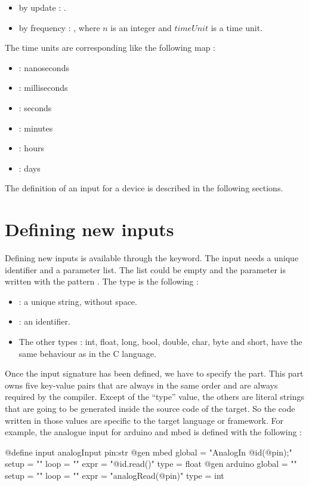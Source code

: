 \begin{itemize}
\item by update : .
\item by frequency : , where
  $n$ is an integer and $timeUnit$ is a time unit.
\end{itemize}

The time units are corresponding like the following map :
\begin{itemize}
\item {} : nanoseconds
\item {} : milliseconds
\item {} : seconds
\item {} : minutes
\item {} : hours
\item {} : days
\end{itemize}

The definition of an input for a device is described in the following sections.

\section*{Defining new inputs}

Defining new inputs is available through the  keyword.
The input needs a unique identifier and a parameter list. The list could be
empty and the parameter is written with the pattern . The type is the following :
\begin{itemize}
\item {} : a unique string, without space.
\item {} : an identifier.
\item The other types : int, float, long, bool, double, char, byte and short,
  have the same behaviour as in the C language.
\end{itemize}

Once the input signature has been defined, we have to specify the
 part. This part owns five key-value pairs that are always in
the same order and are always required by the compiler. Except of the ``type''
value, the others are literal strings that are going to be generated inside the
source code of the target. So the code written in those values are specific to
the target language or framework. For example, the analogue input for arduino and
mbed is defined with the following :
\begin{apdlcode}
@define input analogInput pin:str {
    @gen mbed {
        global = "AnalogIn @id(@pin);"
        setup = ""
        loop = ""
        expr = "@id.read()"
        type = float
    }
    @gen arduino {
        global = ""
        setup = ""
        loop = ""
        expr = "analogRead(@pin)"
        type = int
    }
}
\end{apdlcode}

